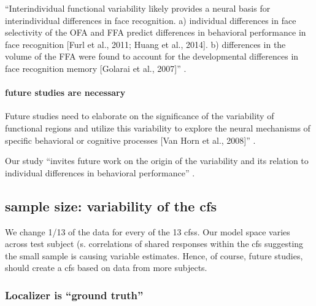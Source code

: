 ``Interindividual functional variability likely provides a neural basis for
interindividual differences in face recognition.
%
a) individual differences in face selectivity of the OFA and FFA predict
differences in behavioral performance in face recognition [Furl et al., 2011;
Huang et al., 2014].
%
b) differences in the volume of the FFA were found to account for the
developmental differences in face recognition memory [Golarai et al., 2007]''
\citep{zhen2015quantifying}.


\paragraph{future studies are necessary}

Future studies need to elaborate on the significance of the variability of
functional regions and utilize this variability to explore the neural mechanisms
of specific behavioral or cognitive processes [Van Horn et al., 2008]''
\citep{zhen2015quantifying}.

Our study ``invites future work on the origin of the variability and its
relation to individual differences in behavioral performance''
\citep{zhen2015quantifying}.


\subsection{sample size: variability of the \ac{cfs}}




We change 1/13 of the data for every of the 13 \acp{cfs}.
%
Our model space varies across test subject (s. correlations of shared responses
within the \ac{cfs} suggesting the small sample is causing variable estimates.
%
Hence, of course, future studies, should create a \ac{cfs} based on data from
more subjects.



\subsubsection{Localizer is ``ground truth''}



